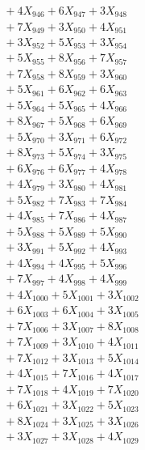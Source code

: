 \documentclass[a4paper,10pt]{article}
\begin{document}
{\begin{align}
&\;  + 4 X_{946} + 6 X_{947} + 3 X_{948} \\[0.3ex]
&\;  + 7 X_{949} + 3 X_{950} + 4 X_{951} \\[0.3ex]
&\;  + 3 X_{952} + 5 X_{953} + 3 X_{954} \\[0.3ex]
&\;  + 5 X_{955} + 8 X_{956} + 7 X_{957} \\[0.3ex]
&\;  + 7 X_{958} + 8 X_{959} + 3 X_{960} \\[0.3ex]
&\;  + 5 X_{961} + 6 X_{962} + 6 X_{963} \\[0.3ex]
&\;  + 5 X_{964} + 5 X_{965} + 4 X_{966} \\[0.3ex]
&\;  + 8 X_{967} + 5 X_{968} + 6 X_{969} \\[0.5ex]\allowbreak
&\;  + 5 X_{970} + 3 X_{971} + 6 X_{972} \\[0.3ex]
&\;  + 8 X_{973} + 5 X_{974} + 3 X_{975} \\[0.3ex]
&\;  + 6 X_{976} + 6 X_{977} + 4 X_{978} \\[0.3ex]
&\;  + 4 X_{979} + 3 X_{980} + 4 X_{981} \\[0.3ex]
&\;  + 5 X_{982} + 7 X_{983} + 7 X_{984} \\[0.3ex]
&\;  + 4 X_{985} + 7 X_{986} + 4 X_{987} \\[0.3ex]
&\;  + 5 X_{988} + 5 X_{989} + 5 X_{990} \\[0.3ex]
&\;  + 3 X_{991} + 5 X_{992} + 4 X_{993} \\[0.3ex]
&\;  + 4 X_{994} + 4 X_{995} + 5 X_{996} \\[0.3ex]
&\;  + 7 X_{997} + 4 X_{998} + 4 X_{999} \\[0.5ex]\allowbreak
&\;  + 4 X_{1000} + 5 X_{1001} + 3 X_{1002} \\[0.3ex]
&\;  + 6 X_{1003} + 6 X_{1004} + 3 X_{1005} \\[0.3ex]
&\;  + 7 X_{1006} + 3 X_{1007} + 8 X_{1008} \\[0.3ex]
&\;  + 7 X_{1009} + 3 X_{1010} + 4 X_{1011} \\[0.3ex]
&\;  + 7 X_{1012} + 3 X_{1013} + 5 X_{1014} \\[0.3ex]
&\;  + 4 X_{1015} + 7 X_{1016} + 4 X_{1017} \\[0.3ex]
&\;  + 7 X_{1018} + 4 X_{1019} + 7 X_{1020} \\[0.3ex]
&\;  + 6 X_{1021} + 3 X_{1022} + 5 X_{1023} \\[0.3ex]
&\;  + 8 X_{1024} + 3 X_{1025} + 3 X_{1026} \\[0.3ex]
&\;  + 3 X_{1027} + 3 X_{1028} + 4 X_{1029} \\[0.5ex]\allowbreak

\end{align}}
\end{document}
